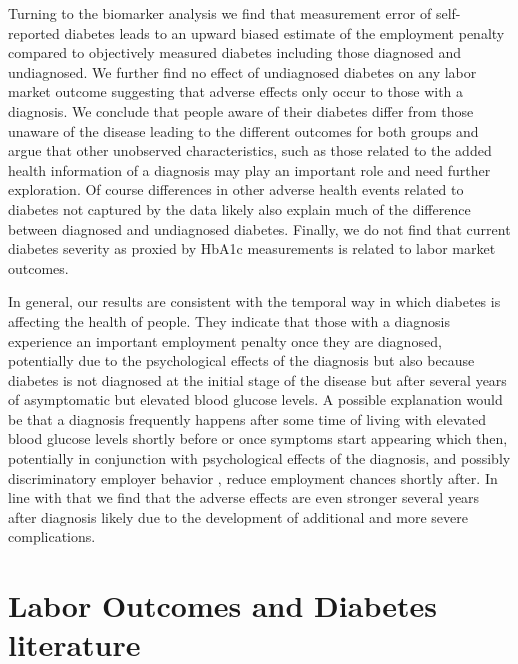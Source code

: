 \documentclass[12pt,english,british]{article}
\begin{document}
Turning to the biomarker analysis we find that measurement error of self-reported diabetes leads to an upward biased estimate of the employment penalty compared to objectively measured diabetes including those diagnosed and undiagnosed. We further find no effect of undiagnosed diabetes on any labor market outcome suggesting that adverse effects only occur to those with a diagnosis. We conclude that people aware of their diabetes differ from those unaware of the disease leading to the different outcomes for both groups and argue that other unobserved characteristics, such as those related to the added health information of a diagnosis may play an important role and need further exploration. Of course differences in other adverse health events related to diabetes not captured by the data likely also explain much of the difference between diagnosed and undiagnosed diabetes. Finally, we do not find that current diabetes severity as proxied by \ac{HbA1c} measurements is related to labor market outcomes.

In general, our results are consistent with the temporal way in which diabetes is affecting the health of people. They indicate that those with a diagnosis experience an important employment penalty once they are diagnosed, potentially due to the psychological effects of the diagnosis but also because diabetes is not diagnosed at the initial stage of the disease but after several years of asymptomatic but elevated blood glucose levels. A possible explanation would be that a diagnosis frequently happens after some time of living with elevated blood glucose levels shortly before or once symptoms start appearing   which then, potentially in conjunction with psychological effects of the diagnosis, and possibly discriminatory employer behavior , reduce employment chances shortly after. In line with that we find that the adverse effects are even stronger several years after diagnosis likely due to the development of additional and more severe complications.



\section{\label{sec:Labor outcomes and diabetes literature} Labor Outcomes and Diabetes literature}
\end{document}
